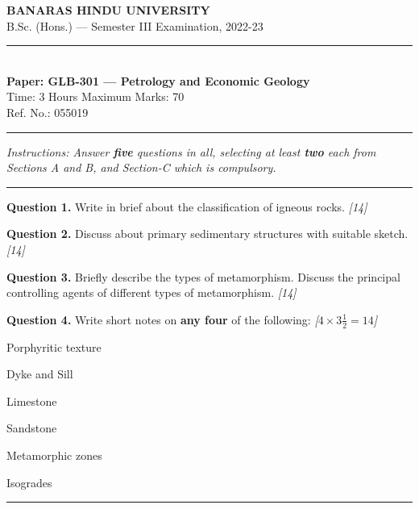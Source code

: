 \documentclass[11pt,a4paper]{article}
\newcommand{\pts}[1]{\hfill   \textit{[#1]}}
\begin{document}
\begin{center}
  {\large\bfseries BANARAS HINDU UNIVERSITY}\\[2pt]
  {\normalsize B.Sc. (Hons.) --- Semester III Examination, 2022-23}\\[6pt]
  \rule{0.8\linewidth}{0.5pt}\\[6pt]
  {\large\bfseries Paper: GLB-301 --- Petrology and Economic Geology}\\[4pt]
  {\normalsize Time: 3 Hours \hfill Maximum Marks: 70}\\[2pt]
  {\small Ref. No.: 055019}
\end{center}
\rule{\linewidth}{0.4pt}
\smallskip



\noindent   \textit{Instructions: Answer   \textbf{five} questions in all, selecting at least   \textbf{two} each from Sections A and B, and Section-C which is compulsory.}
\bigskip

\bigskip


\rule{\linewidth}{0.4pt}\smallskip




\noindent   \textbf{Question 1.} Write in brief about the classification of igneous rocks. \pts{14}

\medskip


\noindent   \textbf{Question 2.} Discuss about primary sedimentary structures with suitable sketch. \pts{14}

\medskip


\noindent   \textbf{Question 3.} Briefly describe the types of metamorphism. Discuss the principal controlling agents of different types of metamorphism. \pts{14}

\medskip


\noindent   \textbf{Question 4.} Write short notes on   \textbf{any four} of the following: \pts{$4  \times 3\frac{1}{2} = 14$}

\begin{parts}
  \item Porphyritic texture
  \item Dyke and Sill
  \item Limestone
  \item Sandstone
  \item Metamorphic zones
  \item Isogrades
\end{parts}

\bigskip


\rule{\linewidth}{0.4pt}\smallskip
\end{document}
